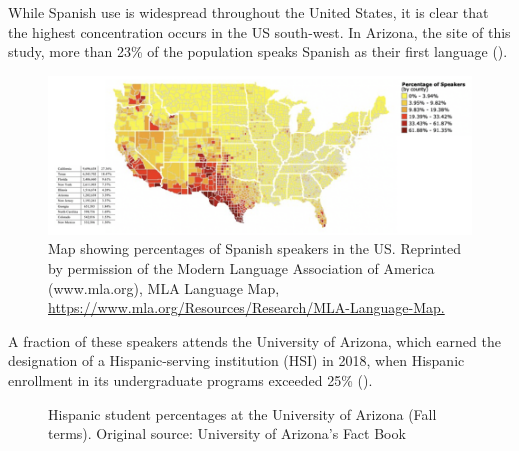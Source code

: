 \documentclass[output=paper]{../langscibook}
\begin{document}
\clearpage
While Spanish use is widespread throughout the United States, it is clear that the highest concentration occurs in the US south-west. In Arizona, the site of this study, more than 23\% of the population speaks Spanish as their first language ().

\begin{figure}
  \includegraphics[width=\textwidth]{figures/Chapter3-img003.png}
  \caption{Map showing percentages of Spanish speakers in the US.  Reprinted by permission of the Modern
Language Association of America (www.mla.org), MLA Language Map, \url{https://www.mla.org/Resources/Research/MLA-Language-Map.}}
  \label{fig:3:3}
\end{figure}


A fraction of these speakers attends the University of Arizona, which earned the designation of a Hispanic-serving institution (HSI) in 2018, when Hispanic enrollment in its undergraduate programs exceeded 25\% ().

 

\begin{figure}
\footnotesize
  \caption{Hispanic student percentages at the University of Arizona (Fall terms). Original source: University of Arizona's Fact Book}
    \label{fig:3:4}
\end{figure}
\end{document}
